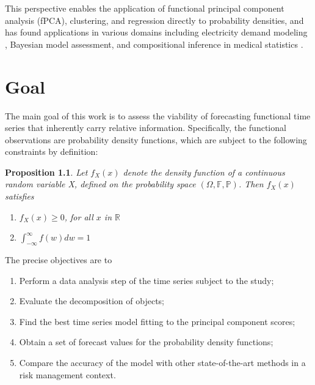 \documentclass[
	12pt,				%
	oneside,			%
	a4paper,			%
	english,			%
	brazil				%
	]{abntex2ppgsi}
\newtheorem{proposition}{Proposition}
\begin{document}
This perspective enables the application of functional principal component analysis (fPCA), clustering, and regression directly to probability densities, and has found applications in various domains including electricity demand modeling \cite{delicado2011compositional}, Bayesian model assessment, and compositional inference in medical statistics \cite{talska2018principal}.






\chapter{Goal}
The main goal of this work is to assess the viability of forecasting functional time series that inherently carry relative information. Specifically, the functional observations are probability density functions, which are subject to the following constraints by definition:
\begin{proposition}
Let $f_X(x)$ denote the density function of a continuous random variable X,  defined on the probability space $(\Omega, \mathbb{F}, \mathbb{P})$. Then $f_X(x)$ satisfies
\begin{enumerate}
    \item $f_X(x)\geq0$, for all $x$ in $\mathbb{R}$
    \item $\int_{-\infty}^{\infty}f(w)dw=1$
\end{enumerate}
    
\end{proposition}

The precise objectives are to
\begin{enumerate}
    \item Perform a data analysis step of the time series subject to the study;
    \item Evaluate the decomposition of objects;
    \item Find the best time series model fitting to the principal component scores;
    \item Obtain a set of forecast values for the probability density functions;
    \item Compare the accuracy of the model with other state-of-the-art methods in a risk management context.
\end{enumerate}
\end{document}
